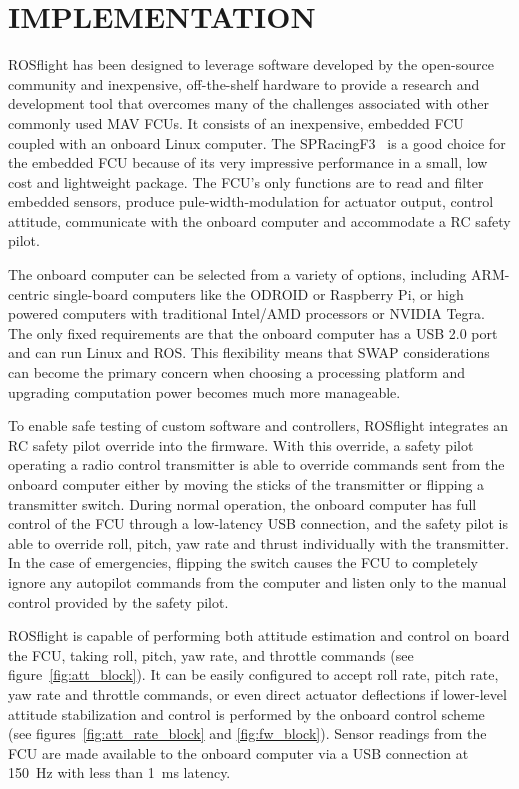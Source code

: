 \documentclass[letterpaper, 10 pt, conference]{ieeeconf}  %
\begin{document}

\section{IMPLEMENTATION}
ROSflight has been designed to leverage software developed by the open-source community and inexpensive, off-the-shelf hardware to provide a research and development tool that overcomes many of the challenges associated with other commonly used MAV FCUs. It consists of an inexpensive, embedded FCU coupled with an onboard Linux computer.  The SPRacingF3~\cite{3_seriouslypro.com_2016} is a good choice for the embedded FCU because of its very impressive performance in a small, low cost and lightweight package. The FCU's only functions are to read and filter embedded sensors, produce pule-width-modulation for actuator output, control attitude, communicate with the onboard computer and accommodate a RC safety pilot.

The onboard computer can be selected from a variety of options, including ARM-centric single-board computers like the ODROID or Raspberry Pi, or high powered computers with traditional Intel/AMD processors or NVIDIA Tegra.  The only fixed requirements are that the onboard computer has a USB 2.0 port and can run Linux and ROS.  This flexibility means that SWAP considerations can become the primary concern when choosing a processing platform and upgrading computation power becomes much more manageable.

To enable safe testing of custom software and controllers, ROSflight integrates an RC safety pilot override into the firmware.  With this override, a safety pilot operating a radio control transmitter is able to override commands sent from the onboard computer either by moving the sticks of the transmitter or flipping a transmitter switch.  During normal operation, the onboard computer has full control of the FCU through a low-latency USB connection, and the safety pilot is able to override roll, pitch, yaw rate and thrust individually with the transmitter. In the case of emergencies, flipping the switch causes the FCU to completely ignore any autopilot commands from the computer and listen only to the manual control provided by the safety pilot.


ROSflight is capable of performing both attitude estimation and control on board the FCU, taking roll, pitch, yaw rate, and throttle commands (see figure~\ref{fig:att_block}).  It can be easily configured to accept roll rate, pitch rate, yaw rate and throttle commands, or even direct actuator deflections if lower-level attitude stabilization and control is performed by the onboard control scheme (see figures~\ref{fig:att_rate_block} and \ref{fig:fw_block}). Sensor readings from the FCU are made available to the onboard computer via a USB connection at 150~Hz with less than 1~ms latency. 
\end{document}
